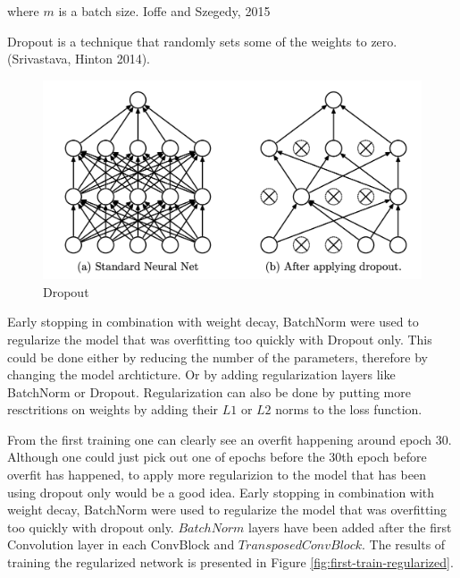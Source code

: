 where $m$ is a batch size. Ioffe and Szegedy, 2015

Dropout is a technique that randomly sets some of the weights to zero. (Srivastava, Hinton 2014).
\begin{figure}[htb]
	\begin{center}
		\includegraphics[width=0.8\linewidth]{bilder/dropout.png}
		\caption{Dropout}\label{fig:dropout}
	\end{center}
\end{figure}

Early stopping in combination with weight decay, BatchNorm were used to regularize the model that was overfitting too quickly with Dropout only.
This could be done either by reducing the number of the parameters, therefore by changing the model archticture. Or by adding regularization layers like BatchNorm or Dropout. Regularization can also be done by putting more resctritions on weights by adding their $L1$ or $L2$ norms to the loss function.

From the first training one can clearly see an overfit happening around epoch 30. Although one could just pick out one of epochs before the 30th epoch before overfit has happened, to apply more regularizion to the model that has been using dropout only would be a good idea. Early stopping in combination with weight decay, BatchNorm were used to regularize the model that was overfitting too quickly with dropout only. $BatchNorm$ layers have been added after the first Convolution layer in each ConvBlock and $TransposedConvBlock$. The results of training the regularized network is presented in Figure \ref{fig:first-train-regularized}.

